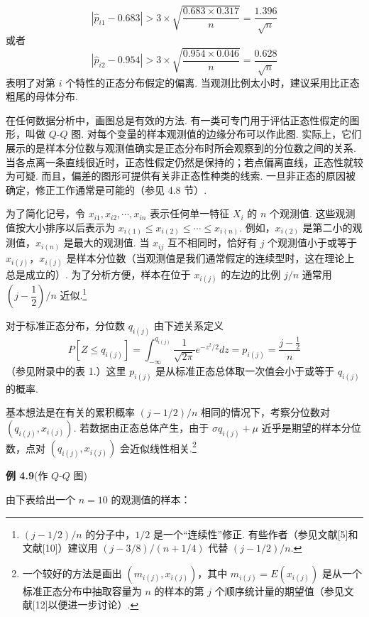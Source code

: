 \[
|\hat{p}_{i1}-0.683|>3\times\sqrt{\frac{0.683\times0.317}{n}}=\frac{1.396}{\sqrt{n}}
\]
或者
\label{eq:4-29}
\begin{equation}
|\hat{p}_{i2}-0.954|>3\times\sqrt{\frac{0.954\times0.046}{n}}=\frac{0.628}{\sqrt{n}}
\tag{4-29}
\end{equation}
表明了对第 $i$ 个特性的正态分布假定的偏离. 当观测比例太小时，建议采用比正态粗尾的母体分布.

在任何数据分析中，画图总是有效的方法. 有一类可专门用于评估正态性假定的图形，叫做 $Q$-$Q$ 图. 对每个变量的样本观测值的边缘分布可以作此图. 实际上，它们展示的是样本分位数与观测值确实是正态分布时所会观察到的分位数之间的关系. 当各点离一条直线很近时，正态性假定仍然是保持的；若点偏离直线，正态性就较为可疑. 而且，偏差的图形可提供有关非正态性种类的线索. 一旦非正态的原因被确定，修正工作通常是可能的（参见 4.8 节）.

为了简化记号，令 $x_{i1},x_{i2},\cdots,x_{in}$ 表示任何单一特征 $X_i$ 的 $n$ 个观测值. 这些观测值按大小排序以后表示为 $x_{i(1)}\leqslant x_{i(2)}\leqslant\cdots\leqslant x_{i(n)}$. 例如，$x_{i(2)}$ 是第二小的观测值，$x_{i(n)}$ 是最大的观测值. 当 $x_{ij}$ 互不相同时，恰好有 $j$ 个观测值小于或等于 $x_{i(j)}$，$x_{i(j)}$ 是样本分位数（当观测值是我们通常假定的连续型时，这在理论上总是成立的）. 为了分析方便，样本在位于 $x_{i(j)}$ 的左边的比例 $j/n$ 通常用 $\left(j-\dfrac{1}{2}\right)\big/n$ 近似.\footnote{$(j-1/2)/n$ 的分子中，$1/2$ 是一个“连续性”修正. 有些作者（参见文献[5]和文献[10]）建议用 $(j-3/8)/(n+1/4)$ 代替 $(j-1/2)/n$.}

对于标准正态分布，分位数 $q_{i(j)}$ 由下述关系定义
\label{eq:4-30}
\begin{equation}
P[Z\leqslant q_{i(j)}]=\int_{-\infty}^{q_{i(j)}}\frac{1}{\sqrt{2\pi}}e^{-z^{2}/2}dz=p_{i(j)}=\frac{j-\frac{1}{2}}{n}
\tag{4-30}
\end{equation}
（参见附录中的表 1.）这里 $p_{i(j)}$ 是从标准正态总体取一次值会小于或等于 $q_{i(j)}$ 的概率.

基本想法是在有关的累积概率 $(j-1/2)/n$ 相同的情况下，考察分位数对 $(q_{i(j)},x_{i(j)})$. 若数据由正态总体产生，由于 $\sigma q_{i(j)}+\mu$ 近乎是期望的样本分位数，点对 $(q_{i(j)},x_{i(j)})$ 会近似线性相关.\footnote{一个较好的方法是画出 $(m_{i(j)},x_{i(j)})$，其中 $m_{i(j)}=E(x_{i(j)})$ 是从一个标准正态分布中抽取容量为 $n$ 的样本的第 $j$ 个顺序统计量的期望值（参见文献[12]以便进一步讨论）.}

\noindent\textbf{例 4.9}\quad (作 $Q$-$Q$ 图)

由下表给出一个 $n=10$ 的观测值的样本：

